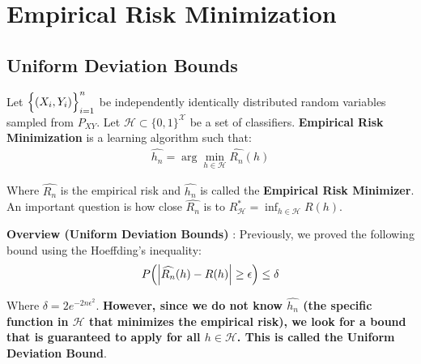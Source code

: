 \newpage\section{Empirical Risk Minimization}

\subsection{Uniform Deviation Bounds}
\begin{definition}
    Let $\Big\{ (X_i, Y_i) \Big\}_{i=1}^n$ be independently identically distributed random variables sampled from $P_{XY}$. Let $\mathcal{H}\subset \{0,1\}^{\mathcal{X}}$ be a set of classifiers. \textbf{Empirical Risk Minimization} is a learning algorithm such that:
    \begin{align*}
        \widehat{h_n} = \arg\min_{h\in\mathcal{H}} \widehat{R_n}(h)
    \end{align*}

    \noindent Where $\widehat{R_n}$ is the empirical risk and $\widehat{h_n}$ is called the \textbf{Empirical Risk Minimizer}. An important question is how close $\widehat{R_n}$ is to $R^*_\mathcal{H}=\inf_{h\in\mathcal{H}} R(h)$.
\end{definition}

\textbf{Overview (Uniform Deviation Bounds)} : Previously, we proved the following bound using the Hoeffding's inequality:
\begin{align*}
    P\Big( 
        \Big| 
            \widehat{R_n}(h) - R(h)
         \Big| \ge \epsilon
     \Big) \le \delta
\end{align*}

\noindent Where $\delta = 2e^{-2n\epsilon^2}$. \textbf{However, since we do not know $\widehat{h_n}$ (the specific function in $\mathcal{H}$ that minimizes the empirical risk), we look for a bound that is guaranteed to apply for all $h\in\mathcal{H}$. This is called the Uniform Deviation Bound}.

